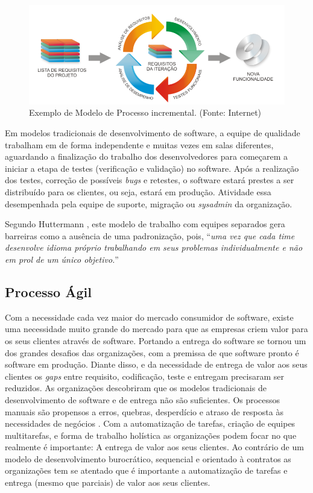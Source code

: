 \begin{figure}[!ht]
\centering
\includegraphics[width=.75\textwidth]{fig/figura22.png}
\caption{Exemplo de Modelo de Processo incremental. (Fonte: Internet)}
\label{fig:figure22}
\end{figure}

Em modelos tradicionais de desenvolvimento de software, a equipe de qualidade trabalham em de forma independente e muitas vezes em salas diferentes, aguardando a finalização do trabalho dos desenvolvedores para começarem a iniciar a etapa de testes (verificação e validação) no software. 
Após a realização dos testes, correção de possíveis \textit{bugs} e retestes, o software estará prestes a ser distribuído para os clientes, ou seja, estará em produção. Atividade essa desempenhada pela equipe de suporte, migração ou \textit{sysadmin} da organização.

Segundo Huttermann \cite{huttermann2012}, este modelo de trabalho com equipes separados gera barreiras como a ausência de uma padronização, pois, “\textit{uma vez que cada time desenvolve idioma próprio trabalhando em seus problemas individualmente e não em prol de um único objetivo.}” 

\subsection{Processo Ágil}

Com a necessidade cada vez maior do mercado consumidor de software, existe uma necessidade muito grande do mercado para que as empresas criem valor para os seus clientes através de software. Portando a entrega do software se tornou um dos grandes desafios das organizações, com a premissa de que software pronto é software em produção. Diante disso, e da necessidade de entrega de valor aos seus clientes os \textit{gaps} entre requisito, codificação, teste e entregam precisaram ser reduzidos. As organizações descobriram que os modelos tradicionais de desenvolvimento de software e de entrega não são suficientes. Os processos manuais são propensos a erros, quebras, desperdício e atraso de resposta às necessidades de negócios \cite{BRAGA2015}. Com a automatização de tarefas, criação de equipes multitarefas, e forma de trabalho holística as organizações podem focar no que realmente é importante: A entrega de valor aos seus clientes. Ao contrário de um modelo de desenvolvimento burocrático, sequencial e orientado à contratos as organizações tem se atentado que é importante a automatização de tarefas e entrega (mesmo que parciais) de valor aos seus clientes.

